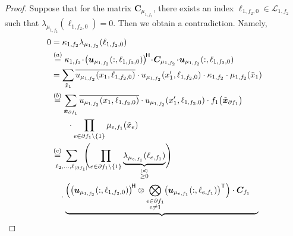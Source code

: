 \documentclass[journal]{IEEEtran}
\newcommand{\add}[1]{{\color{black}#1}}
\newcommand{\vect}[1]{ \bm{#1} }
\newcommand{\set}[1]{\mathcal{#1}}
\newcommand{\setpf}{ \partial f }
\newcommand{\Herm}{\mathsf{H}}
\newcommand{\tran}{\mathsf{T}}
\newcommand{\matr}[1]{\vect{#1}}
\newcommand{\tx}{ \tilde{x} }
\newcommand{\tvx}{ \tilde{\vect{x}}  }
\newcommand{\etofone}{ e, f_1 }
\newcommand{\onetoftwo}{ 1, f_2 }
\begin{document}
\begin{appendices}
\begin{proof}
    Suppose that for the matrix $ \matr{C}_{\mu_{\onetoftwo}} $,
    there exists an index $ \ell_{1,f_{2},0} \in \set{L}_{1,f_2} $
    such that $ \lambda_{ \mu_{\onetoftwo} }( \ell_{1,f_{2},0} ) = 0 $.
    Then we obtain a contradiction. Namely,
    \begin{align}
      0
       & =
      \kappa_{\onetoftwo}\lambda_{ \mu_{\onetoftwo} }( \ell_{1,f_{2},0} )
      \nonumber                                \\
       & \overset{(a)}{=}
      \kappa_{\onetoftwo}
      \!\cdot\!
      \bigl( \matr{u}_{ \mu_{\onetoftwo} }( :, \ell_{1,f_{2},0} ) \bigr)^{\!\Herm}
      \!\cdot\! \matr{C}_{\mu_{\onetoftwo}}
      \!\cdot\!
      \matr{u}_{ \mu_{\onetoftwo} }( :, \ell_{1,f_{2},0} )
      \nonumber                                \\
       & =
      \sum_{\tx_{1}}
      \overline{u_{ \mu_{\onetoftwo} }( x_{1}, \ell_{1,f_{2},0} )}
      \cdot u_{ \mu_{\onetoftwo} }( x_{1}', \ell_{1,f_{2},0} )
      \nonumber                                                                 \cdot \kappa_{1,f_{2}} \cdot \mu_{1,f_{2}}(\tx_{1})
      \nonumber                                \\
       & \overset{(b)}{=}
      \sum_{\tvx_{\setpf_{1}}}
      \overline{u_{ \mu_{\onetoftwo} }( x_{1}, \ell_{1,f_{2},0} )}
      \cdot
      u_{ \mu_{\onetoftwo} }( x_{1}', \ell_{1,f_{2},0} )
      \cdot
      f_{1}\bigl( \tvx_{\setpf_{1}} \bigr)
      \nonumber                                \\
       & \qquad
      \cdot \prod_{e \in \setpf_{1} \setminus \{1\}}
      \mu_{e,f_{1}}(\tx_{e})
      \nonumber                                \\
       & \overset{(c)}{=}
      \!\!\!\!\!\!
      \sum_{
        \ell_{2},\ldots,\ell_{|\setpf_{1}|}
      }\!\!\!
      \Biggl(
      \prod_{e \in \setpf_{1} \setminus \{1\}}
      \underbrace{ \lambda_{\mu_{\etofone}}( \ell_{e,f_{1}} ) }_{\overset{(d)}{\geq 0} }
      \Biggr)
      \nonumber                                \\
       & \quad\cdot
      \underbrace{
        \begin{aligned}
           & \add{\Bigl(}
          \bigl( \matr{u}_{ \mu_{\onetoftwo} }
          ( :, \ell_{1,f_{2},0} ) \bigr)^{\!\Herm}
          \otimes
          \mathop{\bigotimes}_{\substack{e \in \setpf_{1}\\ e \neq 1}}
          \bigl( \matr{u}_{\mu_{\etofone}}
          ( :, \ell_{e,f_1} ) \bigr)^{\tran}
          \add{\Bigr)}
          \cdot \matr{C}_{f_{1}}

\end{aligned}}
\end{align}
\end{proof}
\end{appendices}
\end{document}
